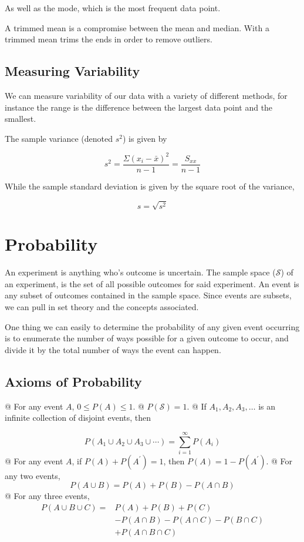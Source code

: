     As well as the mode, which is the most frequent data point.

    A trimmed mean is a compromise between the mean and median. With a trimmed mean trims the ends in order to remove
    outliers.

    \subsection{Measuring Variability}
    We can measure variability of our data with a variety of different methods, for instance the range is the difference
    between the largest data point and the smallest.

    The sample variance (denoted $s^2$) is given by

        \[ s^2 = \frac{\Sigma {\left( x_i - \bar{x} \right) }^2}{n-1} = \frac{S_{xx} }{n-1} \]

    While the sample standard deviation is given by the square root of the variance,

        \[ s = \sqrt{s^2} \]

\section{Probability}
An experiment is anything who's outcome is uncertain. The sample space ($\mathcal{S}$) of an experiment, is the set of
all possible outcomes for said experiment. An event is any subset of outcomes contained in the sample space. Since
events are subsets, we can pull in set theory and the concepts associated.\newline

One thing we can easily to determine the probability of any given event occurring is to enumerate the number of ways
possible for a given outcome to occur, and divide it by the total number of ways the event can happen.

    \subsection{Axioms of Probability}
    \noindent
    \NewList
    \begin{easylist}[itemize]
    @ For any event $A$, $0 \le P(A) \le 1$.
    @ $P(\mathcal{S}) = 1$.
    @ If $A_1, A_2, A_3, \ldots$ is an infinite collection of disjoint events, then

        \[ P(A_1 \cup A_2 \cup A_3 \cup \cdots) = \sum^\infty_{i=1}P(A_i) \]
    @ For any event $A$, if $P(A) + P(A^\prime) = 1$, then $P(A) = 1 - P(A^\prime)$.
    @ For any two events,
        \[ P(A \cup B) = P(A) + P(B) - P(A \cap B) \]
    @ For any three events,
        \[ \begin{aligned}
            P(A \cup B \cup C) =& P(A) + P(B) + P(C)\\
                                & - P(A \cap B) - P(A \cap C) - P(B \cap C)\\
                                & + P(A \cap B \cap C)
        \end{aligned} \]
    \end{easylist}

